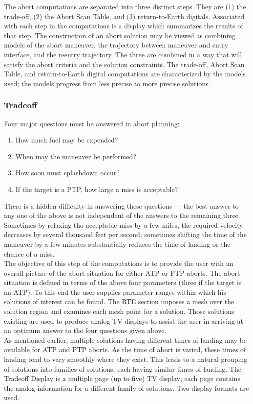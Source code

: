 \documentclass[11pt]{article} %
\begin{document}
The abort computations are separated into three distinct steps. They are (1) the trade-off, (2) the Abort Scan Table, and (3) return-to-Earth digitals. Associated with each step in the computations is a display which summarizes the results of that step. The construction of an abort solution may be viewed as combining models of the abort maneuver, the trajectory between maneuver and entry interface, and the reentry trajectory. The three are combined in a way that will satisfy the abort criteria and the solution constraints. The trade-off, Abort Scan Table, and return-to-Earth digital computations are characterized by the models used; the models progress from less precise to more precise solutions.\\

\subsubsection{Tradeoff}

Four major questions must be answered in abort planning:
\begin{enumerate}
\item How much fuel may be expended?
\item When may the maneuver be performed?
\item How soon must splashdown occur?
\item If the target is a PTP, how large a miss is acceptable?
\end{enumerate}

There is a hidden difficulty in answering these questions — the best answer to any one of the above is not independent of the answers to the remaining three. Sometimes by relaxing tho acceptable miss by a few miles, the required velocity decreases by several thousand feet per second; sometimes shifting the time of the
maneuver by a few minutes substantially reduces the time of landing or the chance of a miss.\\
The objective of this step of the computations is to provide the user with an overall picture of the abort situation for either ATP or PTP aborts. The abort situation is defined in terms of the above four parameters (three if the target is an ATP). To this end the user supplies parameter ranges within which his solutions of interest can be found. The RTE section imposes a mesh over the solution region and examines each mesh point for a solution. Those solutions existing are used to produce analog TV displays to assist the user in arriving at an optimum answer to the four questions given above.\\
As mentioned earlier, multiple solutions having different times of landing may be available for ATP and PTP aborts. As the time of abort is varied, these times
of landing tend to vary smoothly where they exist. This leads to a natural grouping of solutions into families of solutions, each having similar times of landing.
The Tradeoff Display is a multiple page (up to five) TV display; each page contains the analog information for a different family of solutions. Two display formats are used.
\end{document}
